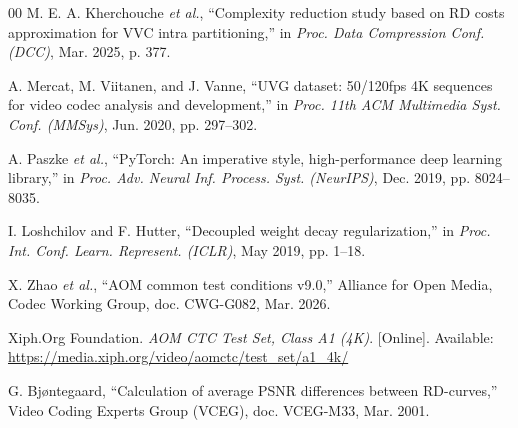 \documentclass[conference]{IEEEtran}
\begin{document}
\begin{thebibliography}{00}
 M. E. A. Kherchouche \emph{et al.}, ``Complexity reduction study based on RD costs approximation for VVC intra partitioning,'' in \emph{Proc. Data Compression Conf. (DCC)}, Mar. 2025, p. 377.

 A. Mercat, M. Viitanen, and J. Vanne, ``UVG dataset: 50/120fps 4K sequences for video codec analysis and development,'' in \emph{Proc. 11th ACM Multimedia Syst. Conf. (MMSys)}, Jun. 2020, pp. 297--302.

 A. Paszke \emph{et al.}, ``PyTorch: An imperative style, high-performance deep learning library,'' in \emph{Proc. Adv. Neural Inf. Process. Syst. (NeurIPS)}, Dec. 2019, pp. 8024--8035.

 I. Loshchilov and F. Hutter, ``Decoupled weight decay regularization,'' in \emph{Proc. Int. Conf. Learn. Represent. (ICLR)}, May 2019, pp. 1--18.

 X. Zhao \emph{et al.}, ``AOM common test conditions v9.0,'' Alliance for Open Media, Codec Working Group, doc. CWG-G082, Mar. 2026.

 Xiph.Org Foundation. \emph{AOM CTC Test Set, Class A1 (4K)}. [Online]. Available: \url{https://media.xiph.org/video/aomctc/test_set/a1_4k/}

 G. Bj{\o}ntegaard, ``Calculation of average PSNR differences between RD-curves,'' Video Coding Experts Group (VCEG), doc. VCEG-M33, Mar. 2001.

\end{thebibliography}
\end{document}

